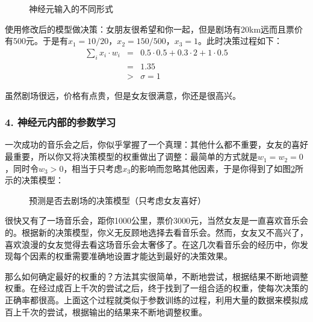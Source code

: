 \begin{figure}[htp]
\centering

\caption{神经元输入的不同形式}
\label{fig:9-8}
\end{figure}

\parinterval 使用修改后的模型做决策：女朋友很希望和你一起，但是剧场有20km远而且票价有500元。于是有$ x_1=10/20 $，$ x_2=150/500 $，$ x_3=1 $。此时决策过程如下：
\begin{eqnarray}
\sum_{i}{x_i\cdot w_i} & = & 0.5\cdot 0.5+0.3\cdot 2+1\cdot 0.5 \nonumber \\
                                   & = & 1.35 \nonumber \\
                                   & > & \sigma =1
\label{eq:9-22}
\end{eqnarray}

\parinterval 虽然剧场很远，价格有点贵，但是女友很满意，你还是很高兴。


\subsubsection{4. 神经元内部的参数学习}

\parinterval 一次成功的音乐会之后，你似乎掌握了一个真理：其他什么都不重要，女友的喜好最重要，所以你又将决策模型的权重做出了调整：最简单的方式就是$ w_1=w_2=0 $，同时令$ w_3>0 $，相当于只考虑$ x_3 $的影响而忽略其他因素，于是你得到了如图\ref {fig:9-9}所示的决策模型：

\begin{figure}[htp]
\centering

\caption{预测是否去剧场的决策模型（只考虑女友喜好）}
\label{fig:9-9}
\end{figure}

\parinterval 很快又有了一场音乐会，距你1000公里，票价3000元，当然女友是一直喜欢音乐会的。根据新的决策模型，你义无反顾地选择去看音乐会。然而，女友又不高兴了，喜欢浪漫的女友觉得去看这场音乐会太奢侈了。在这几次看音乐会的经历中，你发现每个因素的权重需要准确地设置才能达到最好的决策效果。

\parinterval 那么如何确定最好的权重的？方法其实很简单，不断地尝试，根据结果不断地调整权重。在经过成百上千次的尝试之后，终于找到了一组合适的权重，使每次决策的正确率都很高。上面这个过程就类似于参数训练的过程，利用大量的数据来模拟成百上千次的尝试，根据输出的结果来不断地调整权重。

